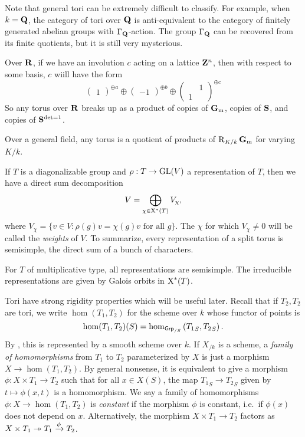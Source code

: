 Note that general tori can be extremely difficult to classify. For example, 
when $k=\mathbf{Q}$, the category of tori over $\mathbf{Q}$ is anti-equivalent to the 
category of finitely generated abelian groups with $\Gamma_{\mathbf{Q}}$-action. The 
group $\Gamma_{\mathbf{Q}}$ can be recovered from its finite quotients, but it is 
still very mysterious. 

\begin{example}
Over $\mathbf{R}$, if we have an involution $c$ acting on a lattice $\mathbf{Z}^n$, then 
with respect to some basis, $c$ wiill have the form 
\[
  \begin{pmatrix} 1 \end{pmatrix}^{\oplus a} \oplus\begin{pmatrix} -1 \end{pmatrix}^{\oplus b} \oplus\begin{pmatrix} & 1 \\ 1 \end{pmatrix}^{\oplus c}
\]
So any torus over $\mathbf{R}$ breaks up as a product of copies of $\mathbf{G}_\mathrm{m}$, copies of 
$\mathbf{S}$, and copies of $\mathbf{S}^{\det=1}$. 
\end{example}

Over a general field, any torus is a quotient of products of 
$\operatorname{R}_{K/k}\mathbf{G}_\mathrm{m}$ for varying $K/k$. 

If $T$ is a diagonalizable group and $\rho:T\to \operatorname{GL}(V)$ a representation of 
$T$, then we have a direct sum decomposition 
\[
  V=\bigoplus_{\chi\in \operatorname{X}^\ast(T)} V_\chi ,
\]
where $V_\chi=\{v\in V:\rho(g)v = \chi(g) v\text{ for all }g\}$. The 
$\chi$ for which $V_\chi\ne 0$ will be called the \emph{weights} of $V$. To 
summarize, every representation of a split torus is semisimple, the direct 
sum of a bunch of characters. 

For $T$ of multiplicative type, all representations are semisimple. The 
irreducible representations are given by Galois orbits in 
$\operatorname{X}^\ast(T)$. 

Tori have strong rigidity properties which will be useful later. Recall that 
if $T_2,T_2$ are tori, we write $\hom(T_1,T_2)$ for the scheme over $k$ whose 
functor of points is 
\[
  \hom(T_1,T_2)(S) = \hom_{\mathsf{Grp}_{/S}}\left({T_1}_{S},{T_2}_S\right) .
\]
By \cite[XI 4.2]{sga3-ii}, this is represented by a smooth scheme over $k$. If 
$X_{/k}$ is a scheme, a \emph{family of homomorphisms} from $T_1$ to $T_2$ 
parameterized by $X$ is just a morphism $X\to \hom(T_1,T_2)$. By general 
nonsense, it is equivalent to give a morphism $\phi:X\times T_1\to T_2$ such 
that for all $x\in X(S)$, the map ${T_1}_S\to {T_2}_S$ given by 
$t\mapsto \phi(x,t)$ is a homomorphism. We say a family of homomorphisms 
$\phi:X\to \hom(T_1,T_2)$ is \emph{constant} if the morphism $\phi$ is 
constant, i.e.~if $\phi(x)$ does not depend on $x$. Alternatively, the 
morphism $X\times T_1\to T_2$ factors as 
$X\times T_1\twoheadrightarrow T_1\xrightarrow \phi T_2$. 


